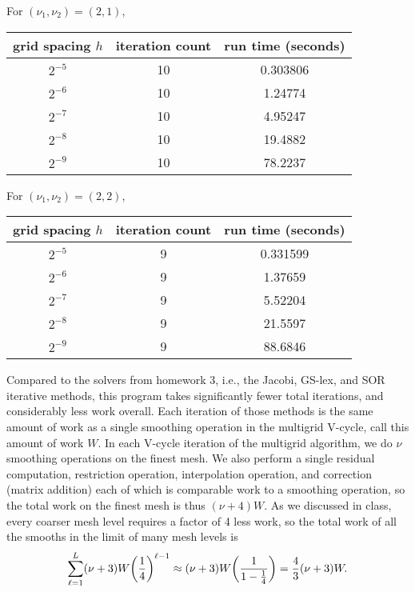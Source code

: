 \documentclass[12pt]{article}
\begin{document}
\noindent For $(\nu_1, \nu_2) = (2,1)$,  \\
\begin{center}
\begin{tabular}{||c|c|c||}
\hline \hline
   grid spacing $h$ &   iteration count &   run time (seconds) \\
\hline \hline
       $2^{-5}$ & 10 & 0.303806 \\
       $2^{-6}$ & 10 & 1.24774   \\
       $2^{-7}$ & 10 & 4.95247  \\
       $2^{-8}$ & 10 & 19.4882   \\
       $2^{-9}$ & 10 & 78.2237 \\
\hline \hline
\end{tabular}
\end{center}
 \newpage
\noindent For $(\nu_1, \nu_2) = (2,2)$,  \\
\begin{center}
\begin{tabular}{||c|c|c||}
\hline \hline
   grid spacing $h$ &   iteration count &   run time (seconds) \\
\hline \hline
       $2^{-5}$    &                 9 &             0.331599 \\
       $2^{-6}$   &                 9 &           1.37659  \\
       $2^{-7}$ &                 9 &             5.52204  \\
       $2^{-8}$ &                 9 &            21.5597   \\
       $2^{-9}$ & 9 & 88.6846 \\
\hline \hline
\end{tabular}
\end{center}

Compared to the solvers from homework 3, i.e., the Jacobi, GS-lex, and SOR iterative methods, this program takes significantly fewer total iterations, and considerably less work overall. Each iteration of those methods is the same amount of work as a single smoothing operation in the multigrid V-cycle, call this amount of work $W$.  In each V-cycle iteration of the multigrid algorithm, we do $\nu$ smoothing operations on the finest mesh. We also perform a single residual computation, restriction operation, interpolation operation, and correction (matrix addition) each of which is comparable work to a smoothing operation, so the total work on the finest mesh is thus $(\nu + 4)W$. As we discussed in class, every coarser mesh level requires a factor of 4 less work, so the total work of all the smooths in the limit of many mesh levels is 
$$\sum_{\ell =1}^L (\nu + 3) W \qty(\dfrac{1}{4})^{\ell - 1} \approx (\nu+3)W\qty(\dfrac{1}{1-\frac{1}{4}}) = \dfrac{4}{3}(\nu+3)W.$$
\end{document}
